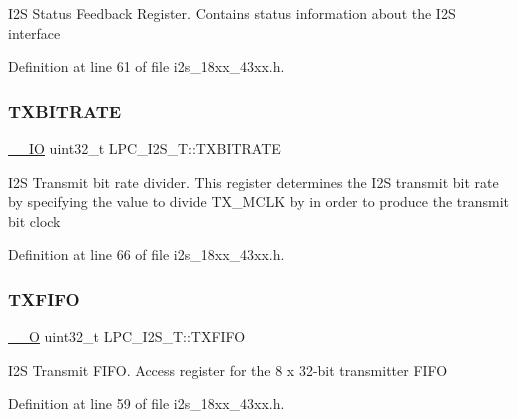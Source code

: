 I2S Status Feedback Register. Contains status information about the I2S interface 

Definition at line 61 of file i2s\+\_\+18xx\+\_\+43xx.\+h.

\mbox{\label{struct_l_p_c___i2_s___t_a16c60f11507aee3e4aef26c365a02ce2}} 
\subsubsection{\texorpdfstring{T\+X\+B\+I\+T\+R\+A\+TE}{TXBITRATE}}
{\footnotesize\ttfamily \hyperlink{core__sc300_8h_aec43007d9998a0a0e01faede4133d6be}{\+\_\+\+\_\+\+IO} uint32\+\_\+t L\+P\+C\+\_\+\+I2\+S\+\_\+\+T\+::\+T\+X\+B\+I\+T\+R\+A\+TE}

I2S Transmit bit rate divider. This register determines the I2S transmit bit rate by specifying the value to divide T\+X\+\_\+\+M\+C\+LK by in order to produce the transmit bit clock 

Definition at line 66 of file i2s\+\_\+18xx\+\_\+43xx.\+h.

\mbox{\label{struct_l_p_c___i2_s___t_aa3a381d218c4342917885fa3a51e82d8}} 
\subsubsection{\texorpdfstring{T\+X\+F\+I\+FO}{TXFIFO}}
{\footnotesize\ttfamily \hyperlink{core__sc300_8h_a7e25d9380f9ef903923964322e71f2f6}{\+\_\+\+\_\+O} uint32\+\_\+t L\+P\+C\+\_\+\+I2\+S\+\_\+\+T\+::\+T\+X\+F\+I\+FO}

I2S Transmit F\+I\+FO. Access register for the 8 x 32-\/bit transmitter F\+I\+FO 

Definition at line 59 of file i2s\+\_\+18xx\+\_\+43xx.\+h.

\mbox{\label{struct_l_p_c___i2_s___t_a30384953ab71a349e60ed555b4ec4552}} 
